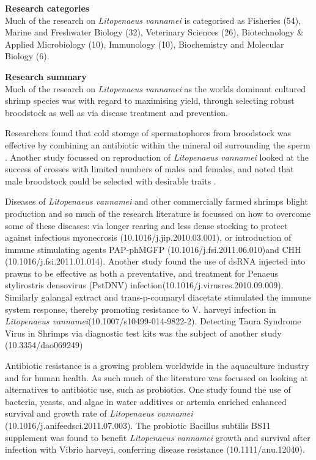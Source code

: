 \documentclass[]{book}
\theoremstyle{definition}
\theoremstyle{definition}
\theoremstyle{definition}
\theoremstyle{remark}
\begin{document}
\textbf{Research categories}\\
Much of the research on \emph{Litopenaeus vannamei} is categorised as
Fisheries (54), Marine and Freshwater Biology (32), Veterinary Sciences
(26), Biotechnology \& Applied Microbiology (10), Immunology (10),
Biochemistry and Molecular Biology (6).

\textbf{Research summary}\\
Much of the research on \emph{Litopenaeus vannamei} as the worlds
dominant cultured shrimp species was with regard to maximising yield,
through selecting robust broodstock as well as via disease treatment and
prevention.

Researchers found that cold storage of spermatophores from broodstock
was effective by combining an antibiotic within the mineral oil
surrounding the sperm \citep{Tuantong_2015}. Another study focussed on
reproduction of \emph{Litopenaeus vannamei} looked at the success of
crosses with limited numbers of males and females, and noted that male
broodstock could be selected with desirable traits
\citep{Aungsuchawan_2008}.

Diseases of \emph{Litopenaeus vannamei} and other commercially farmed
shrimps blight production and so much of the research literature is
focussed on how to overcome some of these diseases: via longer rearing
and less dense stocking to protect against infectious myonecrosis
(10.1016/j.jip.2010.03.001), or introduction of immune stimulating
agents PAP-phMGFP (10.1016/j.fsi.2011.06.010)and CHH
(10.1016/j.fsi.2011.01.014). Another study found the use of dsRNA
injected into prawns to be effective as both a preventative, and
treatment for Penaeus stylirostris densovirus (PstDNV)
infection(10.1016/j.virusres.2010.09.009). Similarly galangal extract
and trans-p-coumaryl diacetate stimulated the immune system response,
thereby promoting resistance to V. harveyi infection in
\emph{Litopenaeus vannamei}(10.1007/s10499-014-9822-2). Detecting Taura
Syndrome Virus in Shrimps via diagnostic test kits was the subject of
another study (10.3354/dao069249)

Antibiotic resistance is a growing problem worldwide in the aquaculture
industry and for human health. As such much of the literature was
focussed on looking at alternatives to antibiotic use, such as
probiotics. One study found the use of bacteria, yeasts, and algae in
water additives or artemia enriched enhanced survival and growth rate of
\emph{Litopenaeus vannamei} (10.1016/j.anifeedsci.2011.07.003). The
probiotic Bacillus subtilis BS11 supplement was found to benefit
\emph{Litopenaeus vannamei} growth and survival after infection with
Vibrio harveyi, conferring disease resistance (10.1111/anu.12040).
\end{document}
